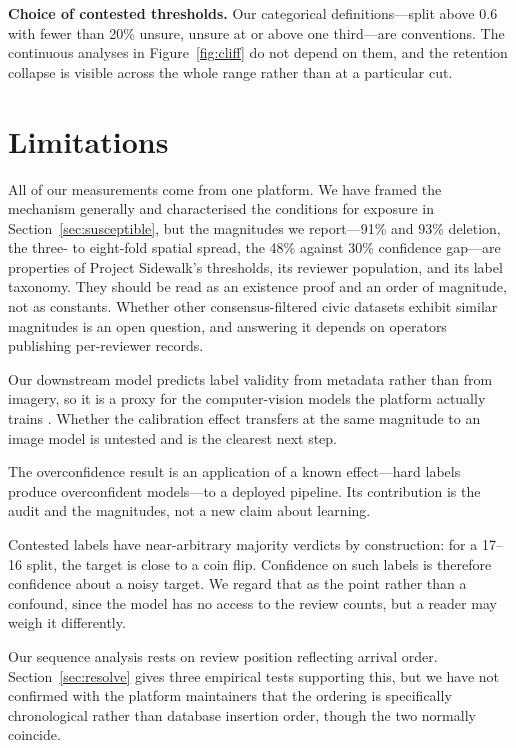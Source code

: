 \documentclass[sigconf]{acmart}
\begin{document}
\textbf{Choice of contested thresholds.} Our categorical definitions---split
above $0.6$ with fewer than 20\% unsure, unsure at or above one third---are
conventions. The continuous analyses in Figure~\ref{fig:cliff} do not depend on
them, and the retention collapse is visible across the whole range rather than
at a particular cut.

\section{Limitations}

All of our measurements come from one platform. We have framed the mechanism
generally and characterised the conditions for exposure in
Section~\ref{sec:susceptible}, but the magnitudes we report---91\% and 93\%
deletion, the three- to eight-fold spatial spread, the 48\% against 30\%
confidence gap---are properties of Project Sidewalk's thresholds, its reviewer
population, and its label taxonomy. They should be read as an existence proof
and an order of magnitude, not as constants. Whether other consensus-filtered
civic datasets exhibit similar magnitudes is an open question, and answering it
depends on operators publishing per-reviewer records.

Our downstream model predicts label validity from metadata rather than from
imagery, so it is a proxy for the computer-vision models the platform actually
trains \cite{li2024labelaid}. Whether the calibration effect transfers at the
same magnitude to an image model is untested and is the clearest next step.

The overconfidence result is an application of a known effect---hard labels
produce overconfident models---to a deployed pipeline. Its contribution is the
audit and the magnitudes, not a new claim about learning.

Contested labels have near-arbitrary majority verdicts by construction: for a
17--16 split, the target is close to a coin flip. Confidence on such labels is
therefore confidence about a noisy target. We regard that as the point rather
than a confound, since the model has no access to the review counts, but a
reader may weigh it differently.

Our sequence analysis rests on review position reflecting arrival order.
Section~\ref{sec:resolve} gives three empirical tests supporting this, but we
have not confirmed with the platform maintainers that the ordering is
specifically chronological rather than database insertion order, though the two
normally coincide.
\end{document}
